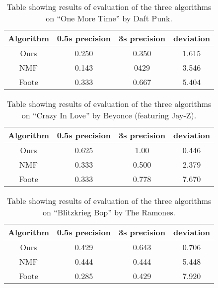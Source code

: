 \begin{table}
\begin{center}
\begin{tabular}{| c | c | c | c |} \hline 
Algorithm  &   0.5s precision   	&  3s precision 	&   deviation   	\\ \hline \hline
Ours			& 	0.250				&  0.350			& 	1.615		\\ \hline
NMF			&  0.143				&  0429				&	3.546		\\ \hline
Foote		&  0.333				&  0.667			& 	5.404		\\ \hline
\end{tabular}
\caption{Table showing results of evaluation of the three algorithms on ``One More Time'' by Daft Punk.}
\label{table:evalonemoretime}
\end{center}
\end{table}

\begin{table}
\begin{center}
\begin{tabular}{| c | c | c | c |} \hline 
Algorithm  &   0.5s precision   	&  3s precision 	&   deviation   	\\ \hline \hline
Ours			& 	0.625				&  1.00				& 	0.446		\\ \hline
NMF			&  0.333				&  0.500			&	2.379		\\ \hline
Foote		&  0.333				&  0.778			& 	7.670		\\ \hline
\end{tabular}
\caption{Table showing results of evaluation of the three algorithms on ``Crazy In Love'' by Beyonce (featuring Jay-Z).}
\label{table:evalcrazyinlove}
\end{center}
\end{table}


\begin{table}
\begin{center}
\begin{tabular}{| c | c | c | c |} \hline 
Algorithm  &   0.5s precision   	&  3s precision 	&   deviation   	\\ \hline \hline
Ours			& 	0.429				&  0.643				& 	0.706		\\ \hline
NMF			&  0.444				&  0.444				&	5.448		\\ \hline
Foote		&  0.285				&  0.429				& 	7.920		\\ \hline
\end{tabular}
\caption{Table showing results of evaluation of the three algorithms on ``Blitzkrieg Bop'' by The Ramones.}
\label{table:evalblitzkrieg}
\end{center}
\end{table}

